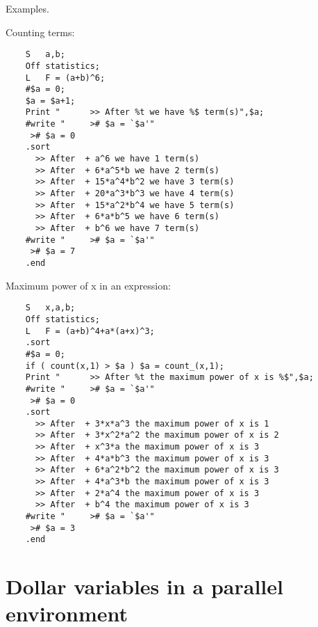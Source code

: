 Examples.

Counting terms:
\begin{verbatim}
    S	a,b;
    Off statistics;
    L	F = (a+b)^6;
    #$a = 0;
    $a = $a+1;
    Print "      >> After %t we have %$ term(s)",$a;
    #write "     ># $a = `$a'"
     ># $a = 0
    .sort
      >> After  + a^6 we have 1 term(s)
      >> After  + 6*a^5*b we have 2 term(s)
      >> After  + 15*a^4*b^2 we have 3 term(s)
      >> After  + 20*a^3*b^3 we have 4 term(s)
      >> After  + 15*a^2*b^4 we have 5 term(s)
      >> After  + 6*a*b^5 we have 6 term(s)
      >> After  + b^6 we have 7 term(s)
    #write "     ># $a = `$a'"
     ># $a = 7
    .end
\end{verbatim}

\noindent Maximum power of x in an expression:
\begin{verbatim}
    S	x,a,b;
    Off statistics;
    L	F = (a+b)^4+a*(a+x)^3;
    .sort
    #$a = 0;
    if ( count(x,1) > $a ) $a = count_(x,1);
    Print "      >> After %t the maximum power of x is %$",$a;
    #write "     ># $a = `$a'"
     ># $a = 0
    .sort
      >> After  + 3*x*a^3 the maximum power of x is 1
      >> After  + 3*x^2*a^2 the maximum power of x is 2
      >> After  + x^3*a the maximum power of x is 3
      >> After  + 4*a*b^3 the maximum power of x is 3
      >> After  + 6*a^2*b^2 the maximum power of x is 3
      >> After  + 4*a^3*b the maximum power of x is 3
      >> After  + 2*a^4 the maximum power of x is 3
      >> After  + b^4 the maximum power of x is 3
    #write "     ># $a = `$a'"
     ># $a = 3
    .end
\end{verbatim}

\section{Dollar variables in a parallel environment}
\label{pardollars}


